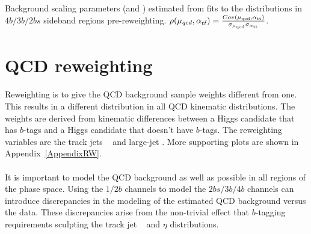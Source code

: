\begin{table}[htb!]
\begin{center}
\caption{Background scaling parameters (\muqcd and \alphatt) estimated from fits to the \mleadJ distributions in $4b/3b/2bs$ sideband regions pre-reweighting. $\rho(\mu_{qcd},\alpha_{t\bar{t}}) = \frac{Cov(\rm \mu_{qcd},\rm \alpha_{\rm tt})}{\rm \sigma_{\mu_{qcd}} \rm \sigma_{\rm \alpha_{ tt}} }$.}

\label{tab:bkgfit_prereweight}
\end{center}
\end{table}



\section{QCD reweighting}
\label{sec:boosted-reweight}

\paragraph{}
Reweighting is to give the QCD background sample weights different from one.
This results in a different distribution in all QCD kinematic distributions.
The weights are derived from kinematic differences between a Higgs candidate that has $b$-tags and a Higgs candidate that doesn't have $b$-tags.
The reweighting variables are the track jets \pt~ and large-\R jet \pt.
More supporting plots are shown in Appendix~\ref{AppendixRW}.

\paragraph{}
It is important to model the QCD background as well as possible in all regions of the phase space.
Using the $1/2b$ channels to model the $2bs/3b/4b$ channels can introduce discrepancies in the modeling of the estimated QCD background versus the data. 
These discrepancies arise from the non-trivial effect that $b$-tagging requirements sculpting the track jet \pt~ and $\eta$ distributions.

